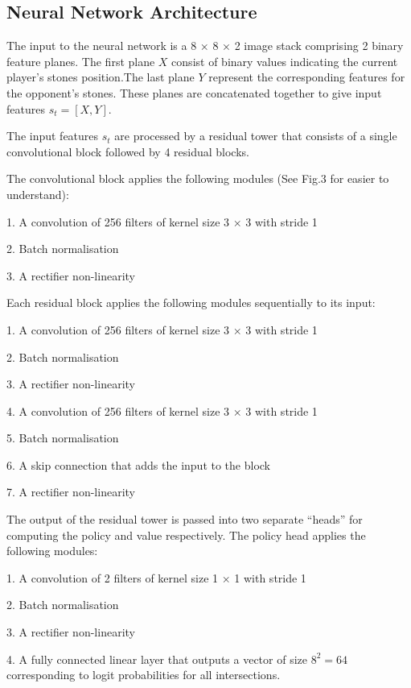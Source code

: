 \documentclass[12pt,a4paper]{article}
\begin{document}
\subsection{Neural Network Architecture}
\hspace{0.6cm}The input to the neural network is a 8 × 8 × 2 image stack comprising 2 binary feature planes. The first plane \(X\) consist of binary values indicating the current player's stones position.The last plane \(Y\) represent the corresponding features for the opponent’s stones. These planes are concatenated together to give input features \(s_t = [X, Y]\).\par
The input features \(s_t\) are processed by a residual tower that consists of a single convolutional block followed by 4 residual blocks\cite{ResNet}.\par
The convolutional block applies the following modules (See Fig.3 for easier to understand):\par
1. A convolution of 256 filters of kernel size 3 × 3 with stride 1\par
2. Batch normalisation\cite{BN}\par
3. A rectifier non-linearity\par
Each residual block applies the following modules sequentially to its input:\par
1. A convolution of 256 filters of kernel size 3 × 3 with stride 1\par
2. Batch normalisation\par
3. A rectifier non-linearity\par
4. A convolution of 256 filters of kernel size 3 × 3 with stride 1\par
5. Batch normalisation\par
6. A skip connection that adds the input to the block\par
7. A rectifier non-linearity\par
The output of the residual tower is passed into two separate “heads” for computing the policy and value respectively. The policy head applies the following modules:\par
1. A convolution of 2 filters of kernel size 1 × 1 with stride 1\par
2. Batch normalisation\par
3. A rectifier non-linearity\par
4. A fully connected linear layer that outputs a vector of size \(8^2 = 64\) corresponding to logit probabilities for all intersections.\par
\end{document}
